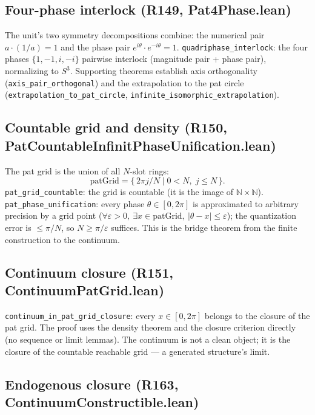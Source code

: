 \documentclass[sigplan,10pt,anonymous,review]{acmart}
\begin{document}
\subsection{Four-phase interlock (R149, Pat4Phase.lean)}

The unit's two symmetry decompositions combine: the numerical pair
$a \cdot (1/a) = 1$ and the phase pair $e^{i\theta} \cdot e^{-i\theta}
= 1$. \verb|quadriphase_interlock|: the four phases $\{1, -1, i, -i\}$
pairwise interlock (magnitude pair + phase pair), normalizing to
$S^3$. Supporting theorems establish axis orthogonality
(\verb|axis_pair_orthogonal|) and the extrapolation to the pat circle
(\verb|extrapolation_to_pat_circle|, \verb|infinite_isomorphic_extrapolation|).

\subsection{Countable grid and density (R150, PatCountableInfinitPhaseUnification.lean)}

The pat grid is the union of all $N$-slot rings:
\[
  \mathrm{patGrid} = \big\{\, 2\pi j / N \;\big|\; 0 < N,\; j \le N
  \,\big\}.
\]
\verb|pat_grid_countable|: the grid is countable (it is the image of
$\mathbb{N} \times \mathbb{N}$). \verb|pat_phase_unification|: every
phase $\theta \in [0, 2\pi]$ is approximated to arbitrary precision by
a grid point ($\forall \varepsilon > 0,\ \exists x \in
\mathrm{patGrid},\ |\theta - x| \le \varepsilon$); the quantization
error is $\le \pi/N$, so $N \ge \pi/\varepsilon$ suffices. This is the
bridge theorem from the finite construction to the continuum.

\subsection{Continuum closure (R151, ContinuumPatGrid.lean)}

\verb|continuum_in_pat_grid_closure|: every $x \in [0, 2\pi]$ belongs
to the closure of the pat grid. The proof uses the density theorem and
the closure criterion directly (no sequence or limit lemmas). The
continuum is not a clean object; it is the closure of the countable
reachable grid --- a generated structure's limit.

\subsection{Endogenous closure (R163, ContinuumConstructible.lean)}
\end{document}
